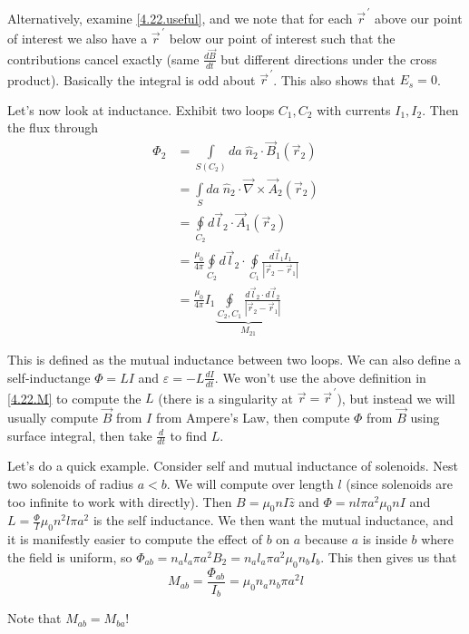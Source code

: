 \documentclass[10pt]{report}
\newcommand{\rd}[2]{\frac{d#1}{d#2}}
\newcommand{\pvec}[1]{\vec{#1}^{\,\prime}}
\newcommand{\abs}[1]{\left|#1\right|}
\begin{document}
Alternatively, examine \eqref{4.22.useful}, and we note that for each $\pvec{r}$ above our point of interest we also have a $\pvec{r}$ below our point of interest such that the contributions cancel exactly (same $\rd{\vec{B}}{t}$ but different directions under the cross product). Basically the integral is odd about $\pvec{r}$. This also shows that $E_s = 0$. 

Let's now look at inductance. Exhibit two loops $C_1, C_2$ with currents $I_1, I_2$. Then the flux through
\begin{align}
    \Phi_2 &= \int\limits_{S(C_2)}^{}da\;\hat{n}_2 \cdot \vec{B}_1(\vec{r}_2)\\
    &= \int\limits_{S}^{}da\;\hat{n}_2 \cdot \vec{\nabla} \times \vec{A}_2(\vec{r}_2)\\
    &= \oint\limits_{C_2} d\vec{l}_2 \cdot \vec{A}_1(\vec{r}_2)\\
    &= \frac{\mu_0}{4\pi}\oint\limits_{C_2}d\vec{l}_2 \cdot \oint\limits_{C_1}\frac{d\vec{l}_1I_1}{\abs{\vec{r}_2 - \vec{r}_1}}\\
    &= \frac{\mu_0}{4\pi}I_1 \underbrace{\oint\limits_{C_2, C_1}\frac{d\vec{l}_2\cdot d\vec{l}_2}{\abs{\vec{r}_2 - \vec{r}_1}}}_{M_{21}}\label{4.22.M}
\end{align}

This is defined as the mutual inductance between two loops. We can also define a self-inductange $\Phi = LI$ and $\varepsilon = -L \rd{I}{t}$. We won't use the above definition in \eqref{4.22.M} to compute the $L$ (there is a singularity at $\vec{r} = \pvec{r}$), but instead we will usually compute $\vec{B}$ from $I$ from Ampere's Law, then compute $\Phi$ from $\vec{B}$ using surface integral, then take $\rd{}{t}$ to find $L$.

Let's do a quick example. Consider self and mutual inductance of solenoids. Nest two solenoids of radius $a<b$. We will compute over length $l$ (since solenoids are too infinite to work with directly). Then $B = \mu_0 nI\hat{z}$ and $\Phi = nl \pi a^2 \mu_0 nI$ and $L = \frac{\Phi}{I}\mu_0 n^2l\pi a^2$ is the self inductance. We then want the mutual inductance, and it is manifestly easier to compute the effect of $b$ on $a$ because $a$ is inside $b$ where the field is uniform, so $\Phi_{ab} = n_al_a \pi a^2B_2 = n_al_a\pi a^2 \mu_0n_bI_b$. This then gives us that
\begin{equation}
    M_{ab} = \frac{\Phi_{ab}}{I_b} = \mu_0 n_an_b\pi a^2l
\end{equation}

Note that $M_{ab} = M_{ba}$!
\end{document}
